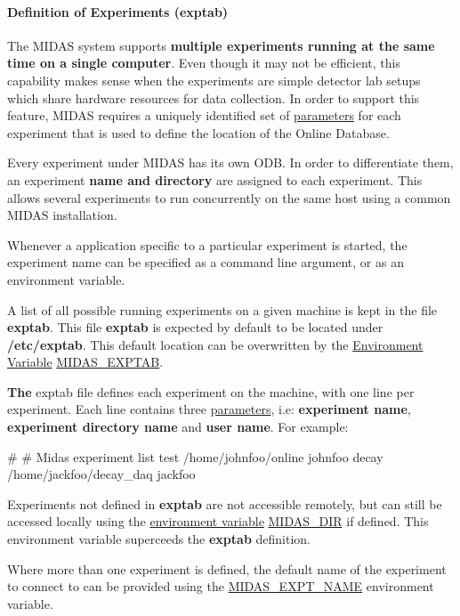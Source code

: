 \label{Q_Linux_idx_experiment_multiple}
\hypertarget{Q_Linux_idx_experiment_multiple}{}
 \label{Q_Linux_idx_exptab}
\hypertarget{Q_Linux_idx_exptab}{}
 \hypertarget{Q_Linux_Q_Linux_Exptab}{}\paragraph{Definition of Experiments (exptab)}\label{Q_Linux_Q_Linux_Exptab}
The MIDAS system supports {\bfseries  multiple experiments running at the same time on a single computer}. Even though it may not be efficient, this capability makes sense when the experiments are simple detector lab setups which share hardware resources for data collection. In order to support this feature, MIDAS requires a uniquely identified set of \hyperlink{structparameters}{parameters} for each experiment that is used to define the location of the Online Database. \par
\par
 Every experiment under MIDAS has its own ODB. In order to differentiate them, an experiment {\bfseries  name and directory } are assigned to each experiment. This allows several experiments to run concurrently on the same host using a common MIDAS installation. \par
\par
 Whenever a application specific to a particular experiment is started, the experiment name can be specified as a command line argument, or as an environment variable. \par
\par
 A list of all possible running experiments on a given machine is kept in the file {\bfseries exptab}. This file {\bfseries exptab} is expected by default to be located under {\bfseries /etc/exptab}. This default location can be overwritten by the \hyperlink{BuildingOptions_BO_Environment_variables}{Environment Variable} \hyperlink{BuildingOptions_BO_MIDAS_EXPTAB}{MIDAS\_\-EXPTAB}. \par
\par
 {\bfseries The} exptab file defines each experiment on the machine, with one line per experiment. Each line contains three \hyperlink{structparameters}{parameters}, i.e: {\bfseries experiment name}, {\bfseries experiment directory name} and {\bfseries user name}. For example: 
\begin{DoxyCode}
  #
  # Midas experiment list
  test   /home/johnfoo/online     johnfoo
  decay  /home/jackfoo/decay_daq  jackfoo
\end{DoxyCode}
 \par
 Experiments not defined in {\bfseries exptab} are not accessible remotely, but can still be accessed locally using the \hyperlink{BuildingOptions_BO_Environment_variables}{environment variable} \hyperlink{BuildingOptions_BO_MIDAS_DIR}{MIDAS\_\-DIR} if defined. This environment variable superceeds the {\bfseries exptab} definition. \par
  Where more than one experiment is defined, the default name of the experiment to connect to can be provided using the \hyperlink{BuildingOptions_BO_MIDAS_EXPT_NAME}{MIDAS\_\-EXPT\_\-NAME} environment variable.



